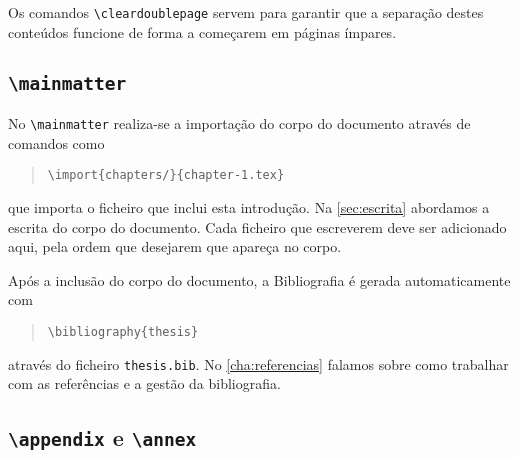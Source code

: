 Os comandos \texttt{\textbackslash cleardoublepage} servem para garantir que a separação destes conteúdos funcione de forma a começarem em páginas ímpares.

\subsection{\texttt{\textbackslash mainmatter}}
No \texttt{\textbackslash mainmatter} realiza-se a importação do corpo do documento através de comandos como
\begin{quote}
    \texttt{\textbackslash import\{chapters/\}\{chapter-1.tex\}}
\end{quote}
que importa o ficheiro que inclui esta introdução. Na \cref{sec:escrita} abordamos a escrita do corpo do documento. Cada ficheiro que escreverem deve ser adicionado aqui, pela ordem que desejarem que apareça no corpo.

Após a inclusão do corpo do documento, a Bibliografia é gerada automaticamente com
\begin{quote}
    \texttt{\textbackslash bibliography\{thesis\}}
\end{quote}
através do ficheiro \texttt{thesis.bib}. No \cref{cha:referencias} falamos sobre como trabalhar com as referências e a gestão da bibliografia.

\subsection{\texttt{\textbackslash appendix} e \texttt{\textbackslash annex}}


